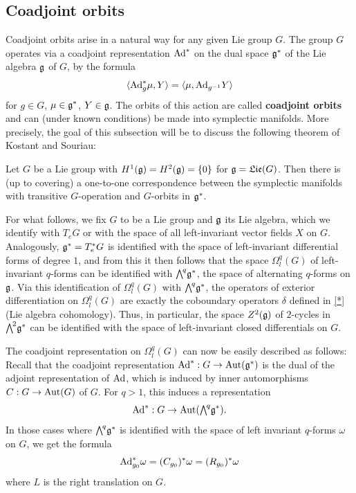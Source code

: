 \fi

\subsection{Coadjoint orbits}
Coadjoint orbits arise in a natural way for any given Lie group $G$. The group $G$ operates via a coadjoint representation $\mathrm{Ad}^*$ on the dual space $\mathfrak{g}^*$ of the Lie algebra $\mathfrak{g}$ of $G$, by the formula
\[\langle\mathrm{Ad}^*_g\mu,Y\rangle=\langle\mu,\mathrm{Ad}_{g^{-1}}Y\rangle\]
for $g\in G$, $\mu\in\mathfrak{g}^*$, $Y\in\mathfrak{g}$. The orbits of this action are called \textbf{coadjoint orbits} and can (under known conditions) be made into symplectic manifolds. More precisely, the goal of this subsection will be to discuss the following theorem of Kostant and Souriau:

\begin{theorem}\label{Lie group transitive symplectic and coadjoint orbit}
Let $G$ be a Lie group with $H^1(\mathfrak{g})=H^2(\mathfrak{g})=\{0\}$ for $\mathfrak{g}=\mathfrak{Lie}(G)$. Then there is (up to covering) a one-to-one correspondence between the symplectic manifolds with transitive $G$-operation and $G$-orbits in $\mathfrak{g}^*$.
\end{theorem}

For what follows, we fix $G$ to be a Lie group and $\mathfrak{g}$ its Lie algebra, which we identify with $T_eG$ or with the space of all left-invariant vector fields $X$ on $G$. Analogously, $\mathfrak{g}^*=T_e^*G$ is identified with the space of left-invariant differential forms of degree $1$, and from this it then follows that the space $\Omega_l^q(G)$ of left-invariant $q$-forms can be identified with $\bigw^q\g^*$, the space of alternating $q$-forms on $\mathfrak{g}$. Via this identification of $\Omega^q_l(G)$ with $\bigw^q\g^*$, the operators of exterior differentiation on $\Omega^q_l(G)$ are exactly the coboundary operators $\delta$ defined in \cref{*} (Lie algebra cohomology). Thus, in particular, the space $Z^2(\mathfrak{g})$ of $2$-cycles in $\bigw^2\g^*$ can be identified with the space of left-invariant closed differentials on $G$.

The coadjoint representation on $\Omega^q_l(G)$ can now be easily described as follows: Recall that the coadjoint representation $\mathrm{Ad}^*:G\to\mathrm{Aut}(\mathfrak{g}^*)$ is the dual of the adjoint representation of $\mathrm{Ad}$, which is induced by inner automorphisms $C:G\to\mathrm{Aut}(G)$ of $G$. For $q>1$, this induces a representation
\[\Ad^*:G\to\Aut(\bigw^q\g^*).\]
In those cases where $\bigw^q\g^*$ is identified with the space of left invariant $q$-forms $\omega$ on $G$, we get the formula
\[\mathrm{Ad}^*_{g_0}\omega=(C_{g_0})^*\omega=(R_{g_0})^*\omega\]
where $L$ is the right translation on $G$.

